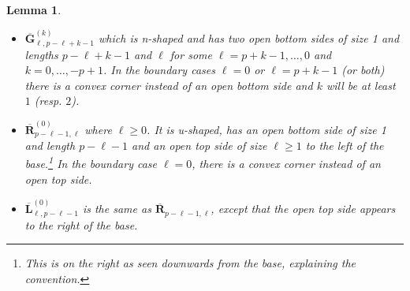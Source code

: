 \documentclass[11pt]{article}
\theoremstyle{plain}
\newtheorem{lemma}[theorem]{Lemma}
\theoremstyle{definition}
\begin{document}
\begin{lemma}
    \begin{itemize}
        \item $\overline{\mathbf{G}}^{(k)}_{\ell,p-\ell+k-1}$ which is n-shaped and has two open bottom sides of size 1 and lengths $p-\ell+k-1$ and $\ell$ for some $\ell = p+k-1,\ldots,0$ and $k=0,\ldots,-p+1$. 
        In the boundary cases $\ell=0$ or $\ell=p+k-1$ (or both) there is a convex corner instead of an open bottom side and $k$ will be at least $1$ (resp. $2$).
        \item $\overline{\mathbf{R}}^{(0)}_{p-\ell-1,\ell}$ where $\ell\geq0$. 
        It is u-shaped, has an open bottom side of size 1 and length $p-\ell-1$ and an open top side of size $\ell\geq 1$ to the left of the base.\footnote{This is on the right as seen downwards from the base, explaining the convention.} 
        In the boundary case $\ell=0$, there is a convex corner instead of an open top side. 
        \item $\overline{\mathbf{L}}^{(0)}_{\ell,p-\ell-1}$ is the same as $\overline{\mathbf{R}}_{p-\ell-1,\ell}$, except that the open top side appears to the right of the base.
    \end{itemize}
\end{lemma}
\end{document}
